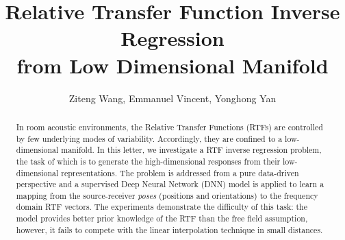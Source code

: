 \documentclass[journal]{IEEEtran}
\begin{document}
\title{Relative Transfer Function Inverse Regression \\ from Low Dimensional Manifold}

\author{Ziteng Wang, Emmanuel Vincent, Yonghong Yan}%

%



\maketitle

\begin{abstract}
In room acoustic environments, the Relative Transfer Functions (RTFs) are controlled by few underlying modes of variability. Accordingly, they are confined to a low-dimensional manifold. In this letter, we investigate a RTF inverse regression problem, the task of which is to generate the high-dimensional responses from their low-dimensional representations. The problem is addressed from a pure data-driven perspective and a supervised Deep Neural Network (DNN) model is applied to learn a mapping from the source-receiver \emph{poses} (positions and orientations) to the frequency domain RTF vectors. The experiments demonstrate the difficulty of this task: the model provides better prior knowledge of the RTF than the free field assumption, however, it fails to compete with the linear interpolation technique in small distances.
\end{abstract}
\end{document}
